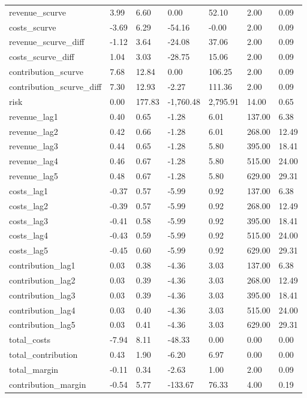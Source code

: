 \begin{landscape}
\begin{longtable}[h!]{lllllll}
revenue_scurve & 3.99 & 6.60 & 0.00 & 52.10 & 2.00 & 0.09 \\
costs_scurve & -3.69 & 6.29 & -54.16 & -0.00 & 2.00 & 0.09 \\
revenue_scurve_diff & -1.12 & 3.64 & -24.08 & 37.06 & 2.00 & 0.09 \\
costs_scurve_diff & 1.04 & 3.03 & -28.75 & 15.06 & 2.00 & 0.09 \\
contribution_scurve & 7.68 & 12.84 & 0.00 & 106.25 & 2.00 & 0.09 \\
contribution_scurve_diff & 7.30 & 12.93 & -2.27 & 111.36 & 2.00 & 0.09 \\
risk & 0.00 & 177.83 & -1,760.48 & 2,795.91 & 14.00 & 0.65 \\
revenue_lag1 & 0.40 & 0.65 & -1.28 & 6.01 & 137.00 & 6.38 \\
revenue_lag2 & 0.42 & 0.66 & -1.28 & 6.01 & 268.00 & 12.49 \\
revenue_lag3 & 0.44 & 0.65 & -1.28 & 5.80 & 395.00 & 18.41 \\
revenue_lag4 & 0.46 & 0.67 & -1.28 & 5.80 & 515.00 & 24.00 \\
revenue_lag5 & 0.48 & 0.67 & -1.28 & 5.80 & 629.00 & 29.31 \\
costs_lag1 & -0.37 & 0.57 & -5.99 & 0.92 & 137.00 & 6.38 \\
costs_lag2 & -0.39 & 0.57 & -5.99 & 0.92 & 268.00 & 12.49 \\
costs_lag3 & -0.41 & 0.58 & -5.99 & 0.92 & 395.00 & 18.41 \\
costs_lag4 & -0.43 & 0.59 & -5.99 & 0.92 & 515.00 & 24.00 \\
costs_lag5 & -0.45 & 0.60 & -5.99 & 0.92 & 629.00 & 29.31 \\
contribution_lag1 & 0.03 & 0.38 & -4.36 & 3.03 & 137.00 & 6.38 \\
contribution_lag2 & 0.03 & 0.39 & -4.36 & 3.03 & 268.00 & 12.49 \\
contribution_lag3 & 0.03 & 0.39 & -4.36 & 3.03 & 395.00 & 18.41 \\
contribution_lag4 & 0.03 & 0.40 & -4.36 & 3.03 & 515.00 & 24.00 \\
contribution_lag5 & 0.03 & 0.41 & -4.36 & 3.03 & 629.00 & 29.31 \\
total_costs & -7.94 & 8.11 & -48.33 & 0.00 & 0.00 & 0.00 \\
total_contribution & 0.43 & 1.90 & -6.20 & 6.97 & 0.00 & 0.00 \\
total_margin & -0.11 & 0.34 & -2.63 & 1.00 & 2.00 & 0.09 \\
contribution_margin & -0.54 & 5.77 & -133.67 & 76.33 & 4.00 & 0.19 \\

\end{longtable}
\end{landscape}
